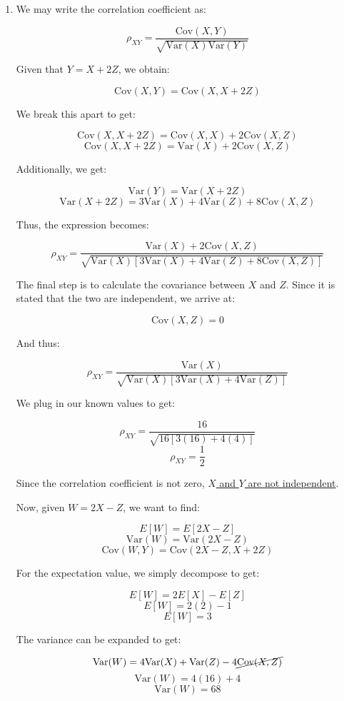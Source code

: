 \begin{enumerate}

  \item We may write the correlation coefficient as:

    $$\rho_{XY}=\frac{\text{Cov}(X,Y)}{\sqrt{\text{Var}(X)\text{Var}(Y)}}$$

    Given that $Y=X+2Z$, we obtain:

    $$\text{Cov}(X,Y)=\text{Cov}(X,X+2Z)$$

    We break this apart to get:

    $$\text{Cov}(X,X+2Z)=\text{Cov}(X,X)+2\text{Cov}(X,Z)$$
    $$\text{Cov}(X,X+2Z)=\text{Var}(X)+2\text{Cov}(X,Z)$$

    Additionally, we get:

    $$\text{Var}(Y)=\text{Var}(X+2Z)$$
    $$\text{Var}(X+2Z)=3\text{Var}(X)+4\text{Var}(Z)+8\text{Cov}(X,Z)$$

    Thus, the expression becomes:

    $$\rho_{XY}=\frac{\text{Var}(X)+2\text{Cov}(X,Z)}{\sqrt{\text{Var}(X)[3\text{Var}(X)+4\text{Var}(Z)+8\text{Cov}(X,Z)]}}$$

    The final step is to calculate the covariance between $X$ and $Z$. Since it is stated that the two are independent, we arrive at:

    $$\text{Cov}(X,Z)=0$$

    And thus:

    $$\rho_{XY}=\frac{\text{Var}(X)}{\sqrt{\text{Var}(X)[3\text{Var}(X)+4\text{Var}(Z)]}}$$

    We plug in our known values to get:

    $$\rho_{XY}=\frac{16}{\sqrt{16[3(16)+4(4)]}}$$
    $$\boxed{\rho_{XY}=\frac{1}{2}}$$

    Since the correlation coefficient is not zero, \underline{$X$ and $Y$ are not independent}.

    Now, given $W=2X-Z$, we want to find:

    $$E[W]=E[2X-Z]$$
    $$\text{Var}(W)=\text{Var}(2X-Z)$$
    $$\text{Cov}(W,Y)=\text{Cov}(2X-Z,X+2Z)$$

    For the expectation value, we simply decompose to get:

    $$E[W]=2E[X]-E[Z]$$
    $$E[W]=2(2)-1$$
    $$\boxed{E[W]=3}$$

    The variance can be expanded to get:

    $$\text{Var}(W)=4\text{Var}(X)+\text{Var}(Z)-4\cancel{\text{Cov}(X,Z)}$$
    $$\text{Var}(W)=4(16)+4$$
    $$\boxed{\text{Var}(W)=68}$$


\end{enumerate}
